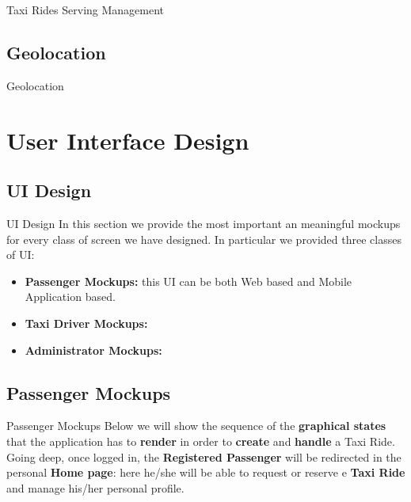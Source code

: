\documentclass{../common/latex_classes/pdf_presentation}
\newcommand{\itemBold}[1]{\item\textbf{#1:}}
\begin{document}
	\begin{frame}{Taxi Rides Serving Management}
	\end{frame}
	
	\subsection{Geolocation}
	
	\begin{frame}{Geolocation}
	\end{frame}
	
	\section{User Interface Design}
	
	\subsection{UI Design}
	
	\begin{frame}{UI Design}
		In this section we provide the most important an meaningful mockups for every class of screen we have designed.
		In particular we provided three classes of UI:
		\begin{itemize}
			\itemBold {Passenger Mockups} this UI can be both Web based and Mobile Application based.
			\itemBold {Taxi Driver Mockups}
			\itemBold {Administrator Mockups}
		\end{itemize}
	\end{frame}
	
	\subsection{Passenger Mockups}
	
	\begin{frame}{Passenger Mockups}
		Below we will show the sequence of the \textbf{graphical states} that the application has to \textbf{render} in order to \textbf{create} and \textbf{handle} a Taxi Ride.
		Going deep, once logged in, the \textbf{Registered Passenger} will be redirected in the personal \textbf{Home page}: here he/she will be able to request or reserve e \textbf{Taxi Ride} and manage his/her personal profile.
	\end{frame}
	
\end{document}
